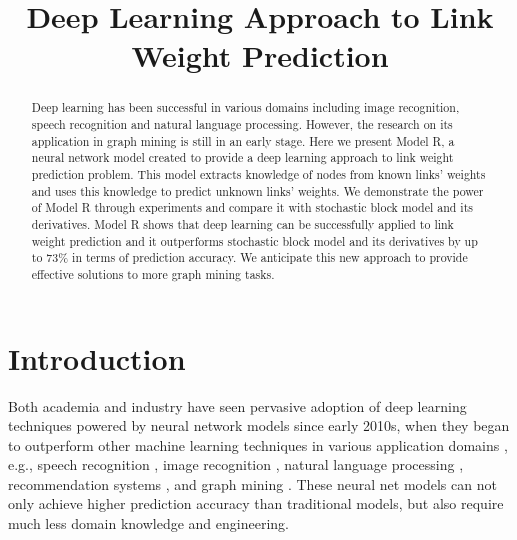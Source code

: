 \documentclass[conference]{IEEEtran}
\begin{document}
	\title{Deep Learning Approach to Link Weight Prediction}
	\author{
		\and
	}
	\maketitle

\begin{abstract}
	Deep learning has been successful in various domains 
	including image recognition, speech recognition and natural language 
	processing.
	However, the research on its application in graph mining is 
	still in an early stage.
	Here we present Model R, a neural network model created to provide a deep 
	learning approach to link weight prediction problem.
	This model extracts knowledge of nodes from known links' weights and 
	uses this knowledge to predict unknown links' weights.
	We demonstrate the power of Model R through experiments and compare it with 
	stochastic block model and its derivatives.
	Model R shows that deep learning can be successfully applied to 
	link weight prediction and it outperforms stochastic block model and its derivatives by up to 73\% in terms of prediction accuracy.
	We anticipate this new approach to provide effective solutions to more
	graph mining tasks.
\end{abstract}

\section{Introduction}
Both academia and industry have seen pervasive adoption of deep learning 
techniques powered by neural network models since early 2010s,
when they began to outperform other machine learning techniques in various 
application domains \cite{lecun2015deep}, e.g.,
speech recognition \cite{hannun2014deep},
image recognition \cite{simonyan2014very},
natural language processing \cite{yao2013recurrent},
recommendation systems \cite{barkan2016item2vec},
and graph mining \cite{grovernode2vec}.
These neural net models can not only achieve higher prediction accuracy than 
traditional models,
but also require much less domain knowledge and engineering.
\end{document}
